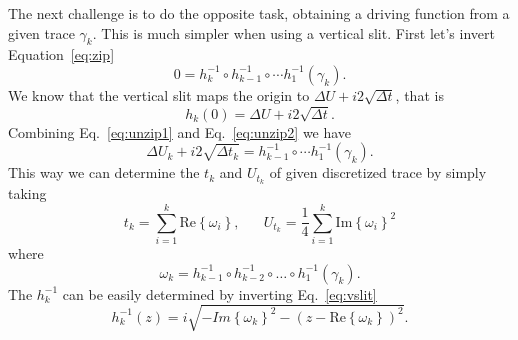 The next challenge is to do the opposite task, obtaining a driving function
from a given trace $\gamma_k$. This is much simpler when using a vertical slit.
First let's invert Equation~\ref{eq:zip}
\begin{equation}
    \label{eq:unzip1}
    0=h_{k}^{-1}\circ h_{k-1}^{-1}\circ\cdots h_{1}^{-1}\left(\gamma_{k}\right).
\end{equation}
We know that the vertical slit maps the origin to $\Delta U+i2\sqrt{\Delta t}$,
that is
\begin{equation}
    \label{eq:unzip2}
    h_{k}\left(0\right)=\Delta U+i2\sqrt{\Delta t}.
\end{equation}
Combining Eq.~\ref{eq:unzip1} and Eq.~\ref{eq:unzip2} we have    
\begin{equation}
    \Delta U_{k}+i2\sqrt{\Delta t_{k}}=
    h_{k-1}^{-1}\circ\cdots h_{1}^{-1}\left(\gamma_{k}\right).
\end{equation}
This way we can determine the $t_k$ and $U_{t_k}$ of given discretized
trace by simply taking
\begin{equation}
    t_{k}=\sum_{i=1}^{k}\mbox{Re}\left\{ \omega_{i}\right\},
    \,\,\,\,\,\,\,\,\,\,
    U_{t_{k}}=\frac{1}{4}\sum_{i=1}^{k}\mbox{Im}\left\{ \omega_{i}\right\} ^{2}
\end{equation}
where
\begin{equation}
    \omega_{k}=h_{k-1}^{-1}\circ h_{k-2}^{-1}\circ
        \ldots\circ h_{1}^{-1}\left(\gamma_{k}\right).
\end{equation}
The $h_k^{-1}$ can be easily determined by inverting Eq.~\ref{eq:vslit}
\begin{equation}
    h_{k}^{-1}\left(z\right)=
    i\sqrt{-Im{\left\{ \omega_{k}\right\}}^{2}
           -{\left(z-\mbox{Re}\left\{ \omega_{k}\right\} \right)}^{2}}.
\end{equation}


